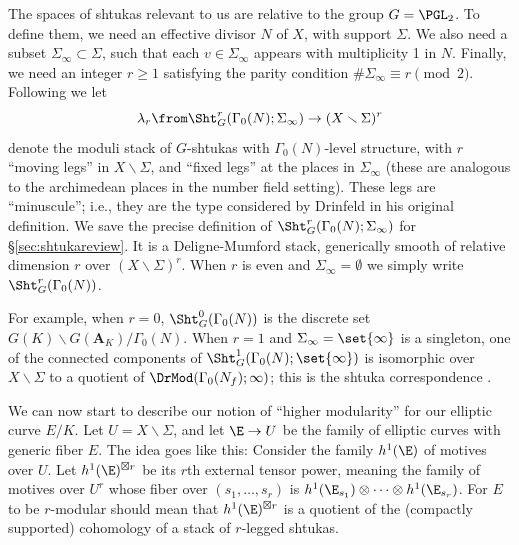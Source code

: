 \documentclass{article}
\begin{document}
The spaces of shtukas relevant to us are relative to the group $G=\PGL_2$.   To define them, we need an effective divisor $N$ of $X$, with support $\Sigma$.  We also need a subset $\Sigma_\infty\subset \Sigma$, such that each $v\in \Sigma_\infty$ appears with multiplicity 1 in $N$.  
Finally, we need an integer $r\geq 1$ satisfying the parity condition $\#\Sigma_\infty\equiv r \pmod{2}$.  Following \cite{YunZhangShtukasII}
 we let
\[ \lambda_r\from \Sht^r_G(\Gamma_0(N);\Sigma_\infty)\to (X\smallsetminus \Sigma)^r  \]
denote the moduli stack of $G$-shtukas with $\Gamma_0(N)$-level structure,  with $r$ ``moving legs'' in $X\smallsetminus \Sigma$, and ``fixed legs'' at the places in $\Sigma_\infty$ (these are analogous to the archimedean places in the number field setting).   These legs are ``minuscule''; i.e., they are the type considered by Drinfeld in his original definition.  We save the precise definition of $\Sht^r_G(\Gamma_0(N);\Sigma_\infty)$ for \S\ref{sec:shtukareview}.  It is a Deligne-Mumford stack, generically smooth of relative dimension $r$ over $(X\smallsetminus\Sigma)^r$.  When $r$ is even and $\Sigma_\infty=\emptyset$ we simply write $\Sht_G^r(\Gamma_0(N))$.  

For example,  when $r=0$, $\Sht^0_G(\Gamma_0(N))$ is the discrete set $G(K)\backslash G(\mathbf{A}_K)/\Gamma_0(N)$.   When $r=1$ and $\Sigma_\infty=\set{\infty}$ is a singleton, one of the connected components of $\Sht^1_G(\Gamma_0(N);\set{\infty})$ is isomorphic over $X\smallsetminus \Sigma$ to a quotient of $\DrMod(\Gamma_0(N_f);\infty)$;  this is the shtuka correspondence \cite{MumfordAnAlgebroGeometricConstruction}.  



We can now start to describe our notion of ``higher modularity'' for our elliptic curve $E/K$.   Let $U=X\smallsetminus \Sigma$, and let $\E\to U$ be the family of elliptic curves with generic fiber $E$.  The idea goes like this:  Consider the family $h^1(\E)$ of motives over $U$.  Let $h^1(\E)^{\boxtimes r}$ be its $r$th external tensor power, meaning the family of motives over $U^r$ whose fiber over $(s_1,\dots,s_r)$ is $h^1(\E_{s_1})\otimes \cdots \otimes h^1(\E_{s_r})$.  For $E$ to be $r$-modular should mean that $h^1(\E)^{\boxtimes r}$ is a quotient of the (compactly supported) cohomology of a stack of $r$-legged shtukas.   
 
\end{document}
